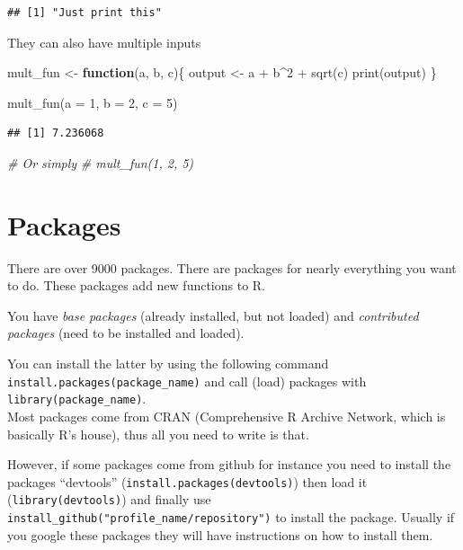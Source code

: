 \documentclass[
]{book}
\newenvironment{Shaded}{\begin{snugshade}}{\end{snugshade}}
\newcommand{\AttributeTok}[1]{\textcolor[rgb]{0.77,0.63,0.00}{#1}}
\newcommand{\CommentTok}[1]{\textcolor[rgb]{0.56,0.35,0.01}{\textit{#1}}}
\newcommand{\ControlFlowTok}[1]{\textcolor[rgb]{0.13,0.29,0.53}{\textbf{#1}}}
\newcommand{\DecValTok}[1]{\textcolor[rgb]{0.00,0.00,0.81}{#1}}
\newcommand{\FunctionTok}[1]{\textcolor[rgb]{0.00,0.00,0.00}{#1}}
\newcommand{\NormalTok}[1]{#1}
\newcommand{\OtherTok}[1]{\textcolor[rgb]{0.56,0.35,0.01}{#1}}
\newcommand{\SpecialCharTok}[1]{\textcolor[rgb]{0.00,0.00,0.00}{#1}}
\begin{document}
\begin{verbatim}
## [1] "Just print this"
\end{verbatim}

They can also have multiple inputs

\begin{Shaded}
\begin{Highlighting}[]
\NormalTok{mult\_fun }\OtherTok{\textless{}{-}} \ControlFlowTok{function}\NormalTok{(a, b, c)\{}
\NormalTok{  output }\OtherTok{\textless{}{-}}\NormalTok{ a }\SpecialCharTok{+}\NormalTok{ b}\SpecialCharTok{\^{}}\DecValTok{2} \SpecialCharTok{+} \FunctionTok{sqrt}\NormalTok{(c)}
  \FunctionTok{print}\NormalTok{(output)}
\NormalTok{\}}

\FunctionTok{mult\_fun}\NormalTok{(}\AttributeTok{a =} \DecValTok{1}\NormalTok{, }\AttributeTok{b =} \DecValTok{2}\NormalTok{, }\AttributeTok{c =} \DecValTok{5}\NormalTok{)}
\end{Highlighting}
\end{Shaded}

\begin{verbatim}
## [1] 7.236068
\end{verbatim}

\begin{Shaded}
\begin{Highlighting}[]
\CommentTok{\# Or simply}
\CommentTok{\# mult\_fun(1, 2, 5)}
\end{Highlighting}
\end{Shaded}

\hypertarget{packages}{%
\section{Packages}\label{packages}}

There are over 9000 packages.
There are packages for nearly everything you want to do.
These packages add new functions to R.

You have \emph{base packages} (already installed, but not loaded) and \emph{contributed packages} (need to be installed and loaded).

You can install the latter by using the following command \texttt{install.packages(\textquotesingle{}package\_name\textquotesingle{})} and call (load) packages with \texttt{library(package\_name)}.\\
Most packages come from CRAN (Comprehensive R Archive Network, which is basically R's house), thus all you need to write is that.

However, if some packages come from github for instance you need to install the packages ``devtools'' (\texttt{install.packages(\textquotesingle{}devtools\textquotesingle{})}) then load it (\texttt{library(devtools)}) and finally use \texttt{install\_github("profile\_name/repository")} to install the package.
Usually if you google these packages they will have instructions on how to install them.
\end{document}
